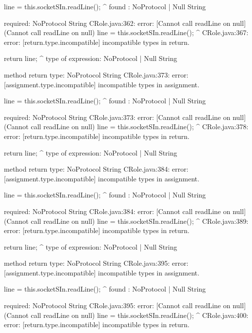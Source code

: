 \begin{code}
            line = this.socketSIn.readLine();
                                          ^
  found   : NoProtocol | Null String

  required: NoProtocol String
CRole.java:362: error: [Cannot call readLine on null] (Cannot call readLine on null)
            line = this.socketSIn.readLine();
                                          ^
CRole.java:367: error: [return.type.incompatible] incompatible types in return.

        return line;
               ^
  type of expression: NoProtocol | Null String

  method return type: NoProtocol String
CRole.java:373: error: [assignment.type.incompatible] incompatible types in assignment.

            line = this.socketSIn.readLine();
                                          ^
  found   : NoProtocol | Null String

  required: NoProtocol String
CRole.java:373: error: [Cannot call readLine on null] (Cannot call readLine on null)
            line = this.socketSIn.readLine();
                                          ^
CRole.java:378: error: [return.type.incompatible] incompatible types in return.

        return line;
               ^
  type of expression: NoProtocol | Null String

  method return type: NoProtocol String
CRole.java:384: error: [assignment.type.incompatible] incompatible types in assignment.

            line = this.socketSIn.readLine();
                                          ^
  found   : NoProtocol | Null String

  required: NoProtocol String
CRole.java:384: error: [Cannot call readLine on null] (Cannot call readLine on null)
            line = this.socketSIn.readLine();
                                          ^
CRole.java:389: error: [return.type.incompatible] incompatible types in return.

        return line;
               ^
  type of expression: NoProtocol | Null String

  method return type: NoProtocol String
CRole.java:395: error: [assignment.type.incompatible] incompatible types in assignment.

            line = this.socketSIn.readLine();
                                          ^
  found   : NoProtocol | Null String

  required: NoProtocol String
CRole.java:395: error: [Cannot call readLine on null] (Cannot call readLine on null)
            line = this.socketSIn.readLine();
                                          ^
CRole.java:400: error: [return.type.incompatible] incompatible types in return.


\end{code}
